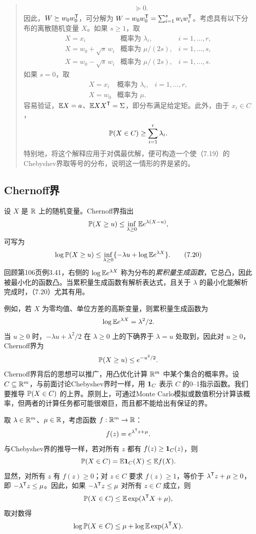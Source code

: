 \begin{quote}
\[\begin{aligned}
 &\succeq0.
\end{aligned}
\]
因此，$W\succeq w_0w_0^{\mathsf T}$，可分解为 $W-w_0w_0^{\mathsf T}=\sum_{i=1}^sw_iw_i^{\mathsf T}$。考虑具有以下分布的离散随机变量 $X$。如果 $s\ge1$，取
\[
\begin{array}{lll}
 X=x_i&\text{概率为 }\lambda_i,&i=1,\ldots,r,\\
 X=w_0+\sqrt{s}\,w_i&\text{概率为 }\mu/(2s),&i=1,\ldots,s,\\
 X=w_0-\sqrt{s}\,w_i&\text{概率为 }\mu/(2s),&i=1,\ldots,s.
\end{array}
\]
如果 $s=0$，取
\[
\begin{array}{lll}
 X=x_i&\text{概率为 }\lambda_i,&i=1,\ldots,r,\\
 X=w_0&\text{概率为 }\mu.&
\end{array}
\]
容易验证，$\mathbb E X=a$、$\mathbb E XX^{\mathsf T}=\Sigma$，即分布满足给定矩。此外，由于 $x_i\in C$，
\[
 \mathbb P(X\in C)\ge\sum_{i=1}^r\lambda_i.
\]
特别地，将这个解释应用于对偶最优解，便可构造一个使（7.19）的Chebyshev界取等号的分布，说明这一情形的界是紧的。
\end{quote}

\subsection{Chernoff界}
设 $X$ 是 $\mathbb R$ 上的随机变量。Chernoff界指出
\[
 \mathbb P(X\ge u)\le\inf_{\lambda\ge0}\mathbb E e^{\lambda(X-u)},
\]
可写为
\begin{equation}
 \log\mathbb P(X\ge u)\le\inf_{\lambda\ge0}\{-\lambda u+\log\mathbb E e^{\lambda X}\}.\tag{7.20}
\end{equation}
回顾第106页例3.41，右侧的 $\log\mathbb E e^{\lambda X}$ 称为分布的\emph{累积量生成函数}，它总凸，因此被最小化的函数凸。当累积量生成函数有解析表达式，且关于 $\lambda$ 的最小化能解析完成时，（7.20）尤其有用。

例如，若 $X$ 为零均值、单位方差的高斯变量，则累积量生成函数为
\[
 \log\mathbb E e^{\lambda X}=\lambda^2/2.
\]
当 $u\ge0$ 时，$-\lambda u+\lambda^2/2$ 在 $\lambda\ge0$ 上的下确界于 $\lambda=u$ 处取到，因此对 $u\ge0$，Chernoff界为
\[
 \mathbb P(X\ge u)\le e^{-u^2/2}.
\]
Chernoff界背后的思想可以推广，用凸优化计算 $\mathbb R^m$ 中某个集合的概率界。设 $C\subseteq\mathbb R^m$，与前面讨论Chebyshev界时一样，用 $\mathbf 1_C$ 表示 $C$ 的0--1指示函数。我们要推导 $\mathbb P(X\in C)$ 的上界。原则上，可通过Monte Carlo模拟或数值积分计算该概率，但两者的计算任务都可能很艰巨，而且都不能给出有保证的界。

取 $\lambda\in\mathbb R^m$、$\mu\in\mathbb R$，考虑函数 $f:\mathbb R^m\to\mathbb R$：
\[
 f(z)=e^{\lambda^{\mathsf T}z+\mu}.
\]
与Chebyshev界的推导一样，若对所有 $z$ 都有 $f(z)\ge\mathbf 1_C(z)$，则
\[
 \mathbb P(X\in C)=\mathbb E\mathbf 1_C(X)\le\mathbb E f(X).
\]
显然，对所有 $z$ 有 $f(z)\ge0$；对 $z\in C$ 要求 $f(z)\ge1$，等价于 $\lambda^{\mathsf T}z+\mu\ge0$，即 $-\lambda^{\mathsf T}z\le\mu$。因此，如果 $-\lambda^{\mathsf T}z\le\mu$ 对所有 $z\in C$ 成立，则
\[
 \mathbb P(X\in C)\le\mathbb E\exp(\lambda^{\mathsf T}X+\mu),
\]
取对数得
\[
 \log\mathbb P(X\in C)\le\mu+\log\mathbb E\exp(\lambda^{\mathsf T}X).
\]

